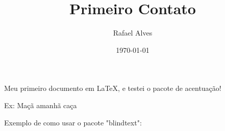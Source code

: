 \documentclass[a4paper,12pt]{article}
\title{Primeiro Contato}
\author{Rafael Alves}
\date{\today}
\begin{document}
\maketitle

Meu primeiro documento em \LaTeX, e testei o pacote de acentuação!

Ex: Maçã amanhã caça

Exemplo de como usar o pacote "blindtext":
\blindtext
\end{document}
